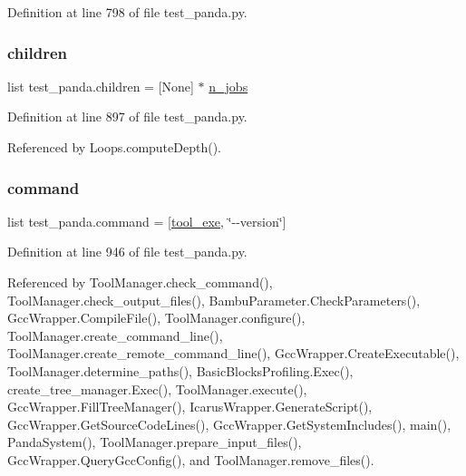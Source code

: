 Definition at line 798 of file test\+\_\+panda.\+py.

\mbox{\label{namespacetest__panda_a0f5aa2c402a9f1b8951cfb79a96f583c}} 
\subsubsection{\texorpdfstring{children}{children}}
{\footnotesize\ttfamily list test\+\_\+panda.\+children = \mbox{[}None\mbox{]} $\ast$ \hyperlink{namespacetest__panda_aa5fd25c613bf73eb86bd917d77eaa028}{n\+\_\+jobs}}



Definition at line 897 of file test\+\_\+panda.\+py.



Referenced by Loops.\+compute\+Depth().

\mbox{\label{namespacetest__panda_a0b725fb2964d71bc2ab55b599dbf4f07}} 
\subsubsection{\texorpdfstring{command}{command}}
{\footnotesize\ttfamily list test\+\_\+panda.\+command = \mbox{[}\hyperlink{namespacetest__panda_aa66614fd26a88bcc42712e9cd7b87797}{tool\+\_\+exe}, \char`\"{}-\/-\/version\char`\"{}\mbox{]}}



Definition at line 946 of file test\+\_\+panda.\+py.



Referenced by Tool\+Manager.\+check\+\_\+command(), Tool\+Manager.\+check\+\_\+output\+\_\+files(), Bambu\+Parameter.\+Check\+Parameters(), Gcc\+Wrapper.\+Compile\+File(), Tool\+Manager.\+configure(), Tool\+Manager.\+create\+\_\+command\+\_\+line(), Tool\+Manager.\+create\+\_\+remote\+\_\+command\+\_\+line(), Gcc\+Wrapper.\+Create\+Executable(), Tool\+Manager.\+determine\+\_\+paths(), Basic\+Blocks\+Profiling.\+Exec(), create\+\_\+tree\+\_\+manager.\+Exec(), Tool\+Manager.\+execute(), Gcc\+Wrapper.\+Fill\+Tree\+Manager(), Icarus\+Wrapper.\+Generate\+Script(), Gcc\+Wrapper.\+Get\+Source\+Code\+Lines(), Gcc\+Wrapper.\+Get\+System\+Includes(), main(), Panda\+System(), Tool\+Manager.\+prepare\+\_\+input\+\_\+files(), Gcc\+Wrapper.\+Query\+Gcc\+Config(), and Tool\+Manager.\+remove\+\_\+files().

